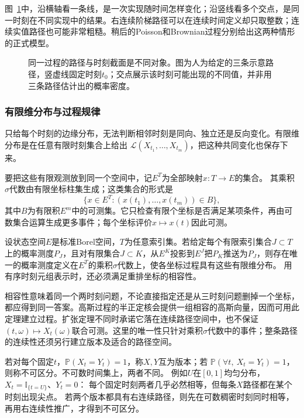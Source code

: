 图~\ref{fig:rv-paths}中，沿横轴看一条线，是一次实现随时间怎样变化；沿竖线看多个交点，是同一时刻在不同实现中的结果。右连续阶梯路径可以在连续时间定义却只取整数；连续实值路径也可能非常粗糙。稍后的Poisson和Brownian过程分别给出这两种情形的正式模型。
\begin{figure}[htbp]
\centering

\caption{同一过程的路径与时刻截面是不同对象。图为人为给定的三条示意路径，竖虚线固定时刻\(t_0\)；交点展示该时刻可能出现的不同值，并非用三条路径估计出的概率密度。}
\label{fig:rv-paths}
\end{figure}

\subsubsection{有限维分布与过程规律}
\label{sec:rv-finite-dimensional-laws}
只给每个时刻的边缘分布，无法判断相邻时刻是同向、独立还是反向变化。有限维分布是在任意有限时刻集合上给出
\(\mathcal L(X_{t_1},\ldots,X_{t_m})\)，把这种共同变化也保存下来。

要把这些有限观测放到同一个空间中，记\(E^T\)为全部映射\(x:T\to E\)的集合。
其乘积\(\sigma\)代数由有限坐标柱集生成；这类集合的形式是
\[
 \{x\in E^T:(x(t_1),\ldots,x(t_m))\in B\},
\]
其中\(B\)为有限积\(E^m\)中的可测集。它只检查有限个坐标是否满足某项条件，再由可数集合运算生成更多事件；每个坐标评价\(x\mapsto x(t)\)因此可测。

\begin{theorem}[Kolmogorov扩张的标准Borel版本]
\label{thm:rv-kolmogorov-extension}
设状态空间\(E\)是标准Borel空间，\(T\)为任意索引集。若给定每个有限索引集合\(J\subset T\)上的概率测度\(P_J\)，且对有限集合\(J\subset K\)，从\(E^K\)投影到\(E^J\)把\(P_K\)推送为\(P_J\)，则存在唯一的概率测度定义在\(E^T\)的乘积\(\sigma\)代数上，使各坐标过程具有这些有限维分布。
用有序时刻元组表示时，还必须满足重排坐标的相容性。
\end{theorem}
相容性意味着同一个两时刻问题，不论直接指定还是从三时刻问题删掉一个坐标，都应得到同一答案。高斯过程的半正定核会提供一组相容的高斯向量，因而可用此定理建立过程。扩张定理不同时承诺它落在连续路径空间中，也不保证
\((t,\omega)\mapsto X_t(\omega)\)联合可测。这里的唯一性只针对乘积\(\sigma\)代数中的事件；整条路径的连续性还须另行建立版本及适合的路径空间。

若对每个固定\(t\)，\(\mathbb P(X_t=Y_t)=1\)，称\(X,Y\)互为版本；若
\(\mathbb P(\forall t,\ X_t=Y_t)=1\)，则称不可区分。不可数时间集上，两者不同。
例如\(U\)在\([0,1]\)均匀分布，\(X_t=\mathbb I_{\{t=U\}}\)、\(Y_t=0\)：
每个固定时刻两者几乎必然相等，但每条\(X\)路径都在某个时刻出现尖点。
若两个版本都具有右连续路径，则先在可数稠密时刻同时相等，再用右连续性推广，才得到不可区分。

